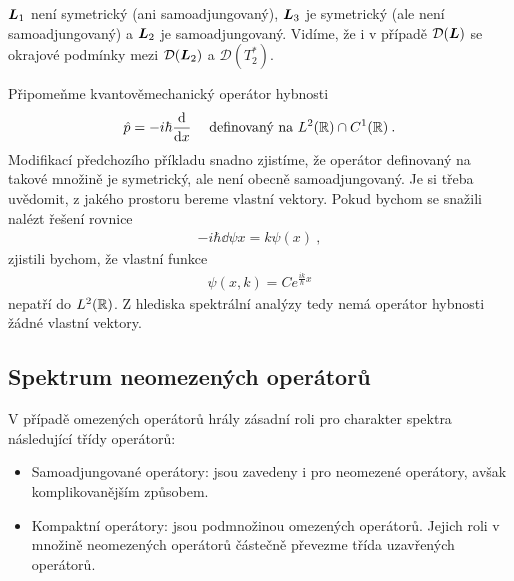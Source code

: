 { $\boldsymbol{L}_1$ není symetrický (ani samoadjungovaný), $\boldsymbol{L}_3$ je symetrický (ale není samoadjungovaný) a $\boldsymbol{L}_2$ je samoadjungovaný. Vidíme, že i v případě $\mathcal{D}(\boldsymbol{L})$ se okrajové podmínky  mezi $\mathcal{D}(\boldsymbol{L}_2)$ a $\mathcal{D}(T_2^*)$.
}


\begin{remark}
Připomeňme kvantověmechanický operátor hybnosti \begin{align*}
    \hat p = -i \hbar \frac{\mathrm{d} }{\mathrm{d} x} \; \quad \text{definovaný na } L^2(\mathbb{R}) \cap C^1(\mathbb{R}) \:.
\end{align*}
Modifikací předchozího příkladu snadno zjistíme, že operátor definovaný na takové množině je symetrický, ale není obecně samoadjungovaný. Je si třeba uvědomit, z jakého prostoru bereme vlastní vektory. Pokud bychom se snažili nalézt řešení rovnice \begin{align*}
    -i \hbar \dd{\psi}{x} = k \psi(x) \:,
\end{align*}
zjistili bychom, že vlastní funkce \begin{align*}
    \psi(x, k) = C e^{\frac{ik}{\hbar} x}
\end{align*}
nepatří do $L^2(\mathbb{R})$. Z hlediska spektrální analýzy tedy nemá operátor hybnosti žádné vlastní vektory.
\end{remark}



\subsection{Spektrum neomezených operátorů}

V případě omezených operátorů hrály zásadní roli pro charakter spektra následující třídy operátorů: \begin{itemize}
    \item Samoadjungované operátory: jsou zavedeny i pro neomezené operátory, avšak komplikovanějším způsobem.
    \item Kompaktní operátory: jsou podmnožinou omezených operátorů. Jejich roli v množině neomezených operátorů částečně převezme třída uzavřených operátorů.
\end{itemize}

